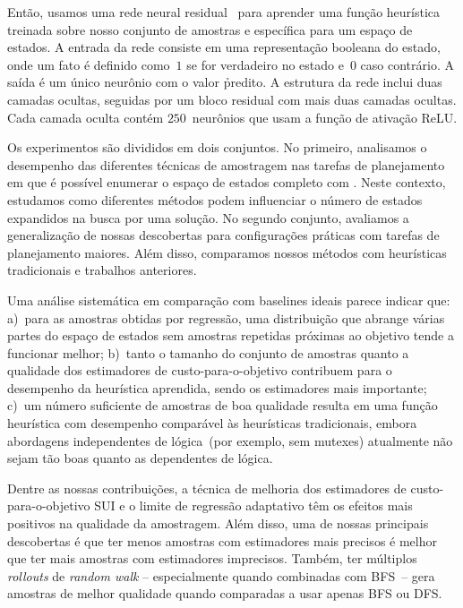 Então, usamos uma rede neural residual~\cite{he2016deep} para aprender uma função heurística treinada sobre nosso conjunto de amostras e específica para um espaço de estados. A entrada da rede consiste em uma representação booleana do estado, onde um fato é definido como~$1$ se for verdadeiro no estado e~$0$ caso contrário. A saída é um único neurônio com o valor \h predito. A estrutura da rede inclui duas camadas ocultas, seguidas por um bloco residual com mais duas camadas ocultas. Cada camada oculta contém $250$~neurônios que usam a função de ativação ReLU.

Os experimentos são divididos em dois conjuntos. No primeiro, analisamos o desempenho das diferentes técnicas de amostragem nas tarefas de planejamento em que é possível enumerar o espaço de estados completo com \hstar. Neste contexto, estudamos como diferentes métodos podem influenciar o número de estados expandidos na busca por uma solução. No segundo conjunto, avaliamos a generalização de nossas descobertas para configurações práticas com tarefas de planejamento maiores. Além disso, comparamos nossos métodos com heurísticas tradicionais e trabalhos anteriores.

Uma análise sistemática em comparação com baselines ideais parece indicar que: a)~para as amostras obtidas por regressão, uma distribuição que abrange várias partes do espaço de estados sem amostras repetidas próximas ao objetivo tende a funcionar melhor; b)~tanto o tamanho do conjunto de amostras quanto a qualidade dos estimadores de custo-para-o-objetivo contribuem para o desempenho da heurística aprendida, sendo os estimadores mais importante; c)~um número suficiente de amostras de boa qualidade resulta em uma função heurística com desempenho comparável às heurísticas tradicionais, embora abordagens independentes de lógica~(por exemplo, sem mutexes) atualmente não sejam tão boas quanto as dependentes de lógica.

Dentre as nossas contribuições, a técnica de melhoria dos estimadores de custo-para-o-objetivo SUI e o limite de regressão adaptativo \meanfx têm os efeitos mais positivos na qualidade da amostragem. Além disso, uma de nossas principais descobertas é que ter menos amostras com estimadores mais precisos é melhor que ter mais amostras com estimadores imprecisos. Também, ter múltiplos \textit{rollouts} de \textit{random walk} -- especialmente quando combinadas com BFS~-- gera amostras de melhor qualidade quando comparadas a usar apenas BFS ou DFS.
